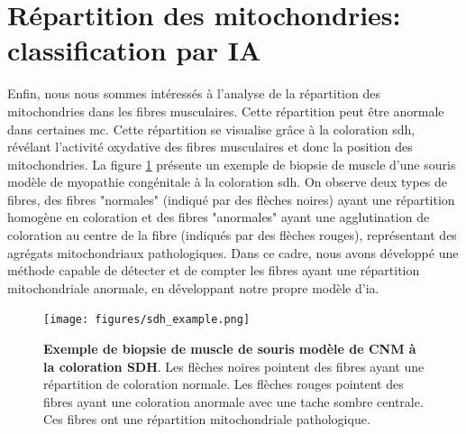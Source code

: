 \clearpage
\section{Répartition des mitochondries: classification par IA}
Enfin, nous nous sommes intéressés à l'analyse de la répartition des mitochondries dans les fibres musculaires. Cette répartition peut être anormale dans certaines \gls{mc}. Cette répartition se visualise grâce à la coloration \gls{sdh}, révélant l'activité oxydative des fibres musculaires et donc la position des mitochondries. La figure \ref{fig:sdh_example} présente un exemple de biopsie de muscle d'une souris modèle de myopathie congénitale à la coloration \gls{sdh}. On observe deux types de fibres, des fibres "normales" (indiqué par des flèches noires) ayant une répartition homogène en coloration et des fibres "anormales" ayant une agglutination de coloration au centre de la fibre (indiqués par des flèches rouges), représentant des agrégats mitochondriaux pathologiques. Dans ce cadre, nous avons développé une méthode capable de détecter et de compter les fibres ayant une répartition mitochondriale anormale, en développant notre propre modèle d'\gls{ia}.

\begin{figure}[htbp]
 \centering
 \texttt{[image: figures/sdh\_example.png]}
 \caption[Exemple de biopsie musculaire à la coloration SDH]{\textbf{Exemple de biopsie de muscle de souris modèle de CNM à la coloration SDH}. Les flèches noires pointent des fibres ayant une répartition de coloration normale. Les flèches rouges pointent des fibres ayant une coloration anormale avec une tache sombre centrale. Ces fibres ont une répartition mitochondriale pathologique.}
 \label{fig:sdh_example}
\end{figure}

